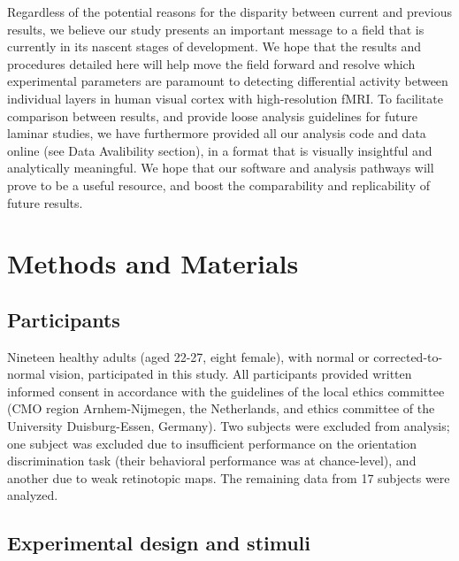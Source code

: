 \documentclass[9pt,lineno]{aperture}
\begin{document}
Regardless of the potential reasons for the disparity between current and previous results, we believe our study presents an important message to a field that is currently in its nascent stages of development. We hope that the results and procedures detailed here will help move the field forward and resolve which experimental parameters are paramount to detecting differential activity between individual layers in human visual cortex with high-resolution fMRI. To facilitate comparison between results, and provide loose analysis guidelines for future laminar studies, we have furthermore provided all our analysis code and data online (see Data Avalibility section), in a format that is visually insightful and analytically meaningful. We hope that our software and analysis pathways will prove to be a useful resource, and boost the comparability and replicability of future results. 

\section{Methods and Materials}
\label{sec:methods}
\subsection{Participants}
Nineteen healthy adults (aged 22-27, eight female), with normal or corrected-to-normal vision, participated in this study. All participants provided written informed consent in accordance with the guidelines of the local ethics committee (CMO region Arnhem-Nijmegen, the Netherlands, and ethics committee of the University Duisburg-Essen, Germany). Two subjects were excluded from analysis; one subject was excluded due to insufficient performance on the orientation discrimination task (their behavioral performance was at chance-level), and another due to weak retinotopic maps. The remaining data from 17 subjects were analyzed.

\subsection{Experimental design and stimuli}
\label{sec:examples}
\end{document}
